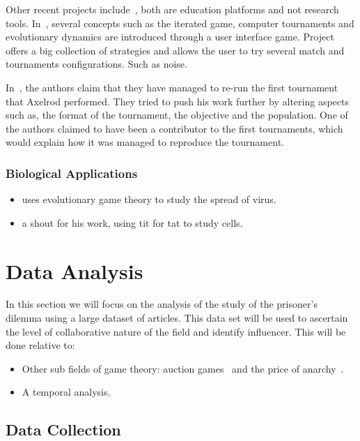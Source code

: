 \documentclass{article}
\theoremstyle{definition}
\begin{document}
Other recent projects include~\cite{pd_trust, pd_game}, both are education
platforms and not research tools. In~\cite{pd_trust}, several concepts such as
the iterated game, computer tournaments and evolutionary dynamics are introduced
through a user interface game. Project~\cite{pd_game} offers a big collection of
strategies and allows the user to try several match and tournaments configurations.
Such as noise.

In~\cite{Rapoport2015}, the authors claim that they have managed to
re-run the first tournament that Axelrod performed. They tried to push his work
further by altering aspects such as, the format of the tournament, the objective
and the population. One of the authors claimed to have been a contributor
to the first tournaments, which would explain how it was managed to reproduce
the tournament.

\subsubsection{Biological Applications}
\begin{itemize}
    \item \cite{Turner1999} uses evolutionary game theory to study the spread of
    virus.
    \item \cite{Douglas2011} a shout for his work, using tit for tat to study cells.
\end{itemize}

\section{Data Analysis}\label{section:analysis}

In this section we will focus on the analysis of the study of the prisoner's dilemma
using a large dataset of articles. This data set will be used to ascertain the level
of collaborative nature of the field and identify influencer. This will be done
relative to:

\begin{itemize}
    \item Other sub fields of game theory: auction games~\cite{menezes2005} and 
    the price of anarchy~\cite{roughgarden2005}.
    \item A temporal analysis.
\end{itemize}

\subsection{Data Collection}
\end{document}

